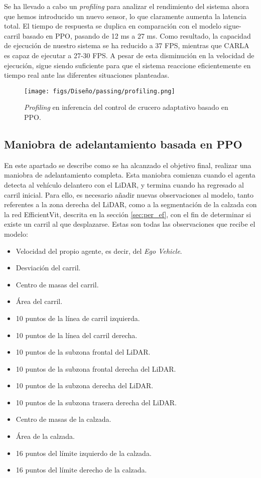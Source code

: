 Se ha llevado a cabo un \textit{profiling} para analizar el rendimiento del sistema ahora que hemos introducido un nuevo sensor, lo que claramente aumenta la latencia total. El tiempo de respuesta se duplica en comparación con el modelo sigue-carril basado en \ac{PPO}, pasando de 12 ms a 27 ms. Como resultado, la capacidad de ejecución de nuestro sistema se ha reducido a 37 \ac{FPS}, mientras que CARLA es capaz de ejecutar a 27-30 \ac{FPS}. A pesar de esta disminución en la velocidad de ejecución, sigue siendo suficiente para que el sistema reaccione eficientemente en tiempo real ante las diferentes situaciones planteadas.

\begin{figure}[ht]
\centering
\texttt{[image: figs/Diseño/passing/profiling.png]}
\caption{\textit{Profiling} en inferencia del control de crucero adaptativo basado en \ac{PPO}.}
\label{fig:profiling_ppo_passing}
\end{figure}

\subsection{Maniobra de adelantamiento basada en PPO}

En este apartado se describe como se ha alcanzado el objetivo final, realizar una maniobra de adelantamiento completa. Esta maniobra comienza cuando el agenta detecta al vehículo delantero con el \ac{LiDAR}, y termina cuando ha regresado al carril inicial. Para ello, es necesario añadir nuevas observaciones al modelo, tanto referentes a la zona derecha del \ac{LiDAR}, como a la segmentación de la calzada con la red EfficientVit, descrita en la sección \ref{sec:per_ef}, con el fin de determinar si existe un carril al que desplazarse. Estas son todas las observaciones que recibe el modelo:
\begin{itemize}
\item Velocidad del propio agente, es decir, del \textit{Ego Vehicle}.
\item Desviación del carril.
\item Centro de masas del carril.
\item Área del carril.
\item 10 puntos de la línea de carril izquierda.
\item 10 puntos de la línea del carril derecha.
\item 10 puntos de la subzona frontal del \ac{LiDAR}.
\item 10 puntos de la subzona frontal derecha del \ac{LiDAR}.
\item 10 puntos de la subzona derecha del \ac{LiDAR}.
\item 10 puntos de la subzona trasera derecha del \ac{LiDAR}.
\item Centro de masas de la calzada.
\item Área de la calzada.
\item 16 puntos del límite izquierdo de la calzada.
\item 16 puntos del límite derecho de la calzada.
\end{itemize}

